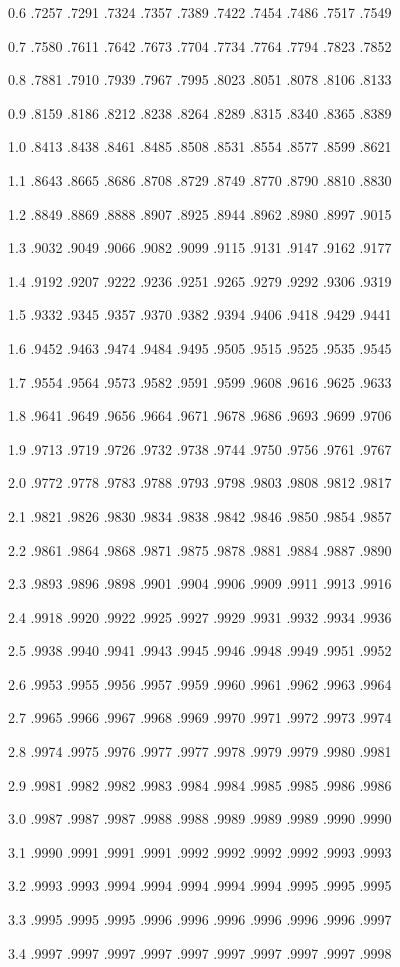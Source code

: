 \documentclass[12pt,fleqn]{article}\usepackage{../common}
\begin{document}
0.6 .7257 .7291 .7324 .7357 .7389 .7422 .7454 .7486 .7517 .7549

0.7 .7580 .7611 .7642 .7673 .7704 .7734 .7764 .7794 .7823 .7852

0.8 .7881 .7910 .7939 .7967 .7995 .8023 .8051 .8078 .8106 .8133

0.9 .8159 .8186 .8212 .8238 .8264 .8289 .8315 .8340 .8365 .8389

1.0 .8413 .8438 .8461 .8485 .8508 .8531 .8554 .8577 .8599 .8621

1.1 .8643 .8665 .8686 .8708 .8729 .8749 .8770 .8790 .8810 .8830

1.2 .8849 .8869 .8888 .8907 .8925 .8944 .8962 .8980 .8997 .9015

1.3 .9032 .9049 .9066 .9082 .9099 .9115 .9131 .9147 .9162 .9177

1.4 .9192 .9207 .9222 .9236 .9251 .9265 .9279 .9292 .9306 .9319

1.5 .9332 .9345 .9357 .9370 .9382 .9394 .9406 .9418 .9429 .9441

1.6 .9452 .9463 .9474 .9484 .9495 .9505 .9515 .9525 .9535 .9545

1.7 .9554 .9564 .9573 .9582 .9591 .9599 .9608 .9616 .9625 .9633

1.8 .9641 .9649 .9656 .9664 .9671 .9678 .9686 .9693 .9699 .9706

1.9 .9713 .9719 .9726 .9732 .9738 .9744 .9750 .9756 .9761 .9767

2.0 .9772 .9778 .9783 .9788 .9793 .9798 .9803 .9808 .9812 .9817

2.1 .9821 .9826 .9830 .9834 .9838 .9842 .9846 .9850 .9854 .9857

2.2 .9861 .9864 .9868 .9871 .9875 .9878 .9881 .9884 .9887 .9890

2.3 .9893 .9896 .9898 .9901 .9904 .9906 .9909 .9911 .9913 .9916

2.4 .9918 .9920 .9922 .9925 .9927 .9929 .9931 .9932 .9934 .9936

2.5 .9938 .9940 .9941 .9943 .9945 .9946 .9948 .9949 .9951 .9952

2.6 .9953 .9955 .9956 .9957 .9959 .9960 .9961 .9962 .9963 .9964

2.7 .9965 .9966 .9967 .9968 .9969 .9970 .9971 .9972 .9973 .9974

2.8 .9974 .9975 .9976 .9977 .9977 .9978 .9979 .9979 .9980 .9981

2.9 .9981 .9982 .9982 .9983 .9984 .9984 .9985 .9985 .9986 .9986

3.0 .9987 .9987 .9987 .9988 .9988 .9989 .9989 .9989 .9990 .9990

3.1 .9990 .9991 .9991 .9991 .9992 .9992 .9992 .9992 .9993 .9993

3.2 .9993 .9993 .9994 .9994 .9994 .9994 .9994 .9995 .9995 .9995

3.3 .9995 .9995 .9995 .9996 .9996 .9996 .9996 .9996 .9996 .9997

3.4 .9997 .9997 .9997 .9997 .9997 .9997 .9997 .9997 .9997 .9998
\end{document}
